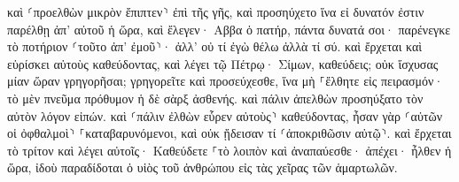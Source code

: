\documentclass{openreader}
\begin{document}
καὶ ⸂προελθὼν μικρὸν ἔπιπτεν⸃ ἐπὶ τῆς γῆς, καὶ προσηύχετο ἵνα εἰ δυνατόν ἐστιν παρέλθῃ ἀπ’ αὐτοῦ ἡ ὥρα, 
καὶ ἔλεγεν· Αββα ὁ πατήρ, πάντα δυνατά σοι· παρένεγκε τὸ ποτήριον ⸂τοῦτο ἀπ’ ἐμοῦ⸃· ἀλλ’ οὐ τί ἐγὼ θέλω ἀλλὰ τί σύ. 
καὶ ἔρχεται καὶ εὑρίσκει αὐτοὺς καθεύδοντας, καὶ λέγει τῷ Πέτρῳ· Σίμων, καθεύδεις; οὐκ ἴσχυσας μίαν ὥραν γρηγορῆσαι; 
γρηγορεῖτε καὶ προσεύχεσθε, ἵνα μὴ ⸀ἔλθητε εἰς πειρασμόν· τὸ μὲν πνεῦμα πρόθυμον ἡ δὲ σὰρξ ἀσθενής. 
καὶ πάλιν ἀπελθὼν προσηύξατο τὸν αὐτὸν λόγον εἰπών. 
καὶ ⸂πάλιν ἐλθὼν εὗρεν αὐτοὺς⸃ καθεύδοντας, ἦσαν γὰρ ⸂αὐτῶν οἱ ὀφθαλμοὶ⸃ ⸀καταβαρυνόμενοι, καὶ οὐκ ᾔδεισαν τί ⸂ἀποκριθῶσιν αὐτῷ⸃. 
καὶ ἔρχεται τὸ τρίτον καὶ λέγει αὐτοῖς· Καθεύδετε ⸀τὸ λοιπὸν καὶ ἀναπαύεσθε· ἀπέχει· ἦλθεν ἡ ὥρα, ἰδοὺ παραδίδοται ὁ υἱὸς τοῦ ἀνθρώπου εἰς τὰς χεῖρας τῶν ἁμαρτωλῶν. 
\end{document}
